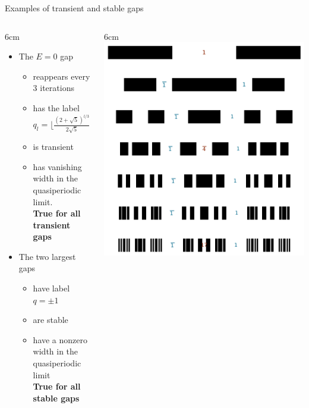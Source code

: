 \documentclass[xcolor=x11names,compress,professionalfonts]{beamer}
\renewcommand{\(}{\begin{columns}}
\renewcommand{\)}{\end{columns}}
\newcommand{\<}[1]{\begin{column}{#1}}
\renewcommand{\>}{\end{column}}
\begin{document}
\begin{frame}{Examples of transient and stable gaps}

\(
\<{6cm}
\begin{itemize}
	\item The $E=0$ gap 
	\begin{itemize}
		\item reappears every $3$ iterations
		\item has the label $q_l = \Big\lfloor \frac{(2+\sqrt{5})^{l/3}}{2 \sqrt{5}} + \frac{1}{2} \Big\rfloor$
		\item is transient
		\item has vanishing width in the quasiperiodic limit. \\
					\textbf{True for all transient gaps}
	\end{itemize}
	\item The two largest gaps 
	\begin{itemize}
		\item have label $q = \pm 1$
		\item are stable
		\item have a nonzero width in the quasiperiodic limit\\
					\textbf{True for all stable gaps}
	\end{itemize}
\end{itemize}
\>

\<{6cm}
\centering
\includegraphics[scale=.45]{img/main_gap_labels.pdf}
\>
\)

\end{frame}
\end{document}
